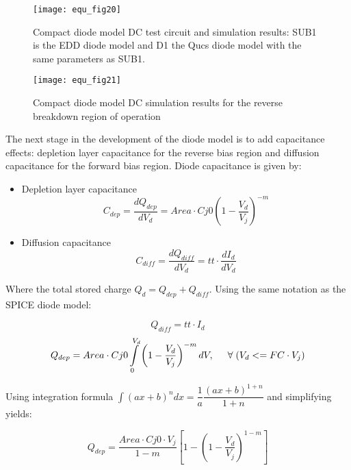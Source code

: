 \begin{figure} 
  \centering
  \texttt{[image: equ\_fig20]}
  \caption{Compact diode model DC test circuit and simulation results: SUB1 is the EDD diode model and D1 the Qucs diode model with the same parameters as SUB1. } 
  \label{fig:equ_20}
\end{figure} 


\begin{figure} 
  \centering
  \texttt{[image: equ\_fig21]}
  \caption{Compact diode model DC simulation results for the reverse breakdown region of operation } 
  \label{fig:equ_21}
\end{figure} 

\vspace{3mm}

The next stage in the development of the diode model is to add
capacitance effects: depletion layer capacitance for the reverse bias
region and diffusion capacitance for the forward bias region. Diode
capacitance is given by:

\begin{itemize}
 \item Depletion layer capacitance
\begin{equation}
 C_{dep} = \dfrac{dQ_{dep}}{dV_{d}} = Area \cdot Cj0\left( 1-\dfrac{V_{d}}{V_{j}}\right) ^{-m}  
\end{equation}
\item Diffusion capacitance
\begin{equation}
 C_{diff} = \dfrac{dQ_{diff}}{dV_{d}} = tt \cdot \dfrac{dI_{d}}{dV_{d}}
\end{equation} 
\end{itemize}

Where the total stored charge $Q_{d} = Q_{dep} + Q_{diff}$.  Using the same notation as the SPICE diode model:

\begin{equation}
Q_{diff} = tt \cdot I_{d}
\end{equation} 
\begin{equation}
 Q_{dep} = Area \cdot Cj0 \int\limits_{0}^{V_{d}}\left( 1-\dfrac{V_d}{V_j}\right)^{-m} dV,  \hspace{5mm} \forall\; (V_{d} <= FC \cdot V_j)
\end{equation} 

Using integration formula $\int (ax+b)^{n}dx = \dfrac{1}{a} \dfrac{\left( ax+b\right) ^{1+n}}{1+n}$ and simplifying yields:

\begin{equation}
 Q_{dep} = \dfrac{Area \cdot Cj0 \cdot V_{j}}{1-m} \left[ 1 - \left( 1-\dfrac{V_d}{V_j}\right)^{1-m}  \right]
\end{equation} 

